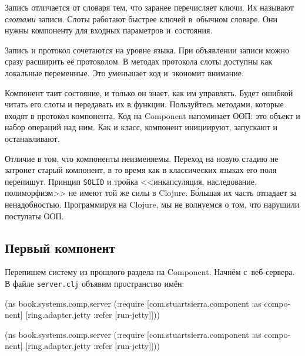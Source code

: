 
Запись отличается от словаря тем, что заранее перечисляет ключи. Их называют
\emph{слотами} записи. Слоты работают быстрее ключей в~обычном словаре. Они
нужны компоненту для входных параметров и~состояния.

Запись и протокол сочетаются на уровне языка. При объявлении записи можно сразу
расширить её протоколом. В методах протокола слоты доступны как локальные
переменные. Это уменьшает код и~экономит внимание.


Компонент таит состояние, и только он знает, как им управлять. Будет ошибкой
читать его слоты и передавать их в функции. Пользуйтесь методами, которые входят
в протокол компонента. Код на Component напоминает ООП: это объект и набор
операций над ним. Как и класс, компонент инициируют, запускают и останавливают.


Отличие в том, что компоненты неизменяемы. Переход на новую стадию не затронет
старый компонент, в то время как в классических языках его поля
перепишут. Принцип \verb|SOLID| и тройка <<инкапсуляция, наследование,
полиморфизм>> не имеют той же силы в Clojure. Б\'{о}льшая их часть отпадает за
ненадобностью. Программируя на Clojure, мы не волнуемся о том, что нарушили
постулаты ООП.

\subsection{Первый компонент}

Перепишем систему из прошлого раздела на Component. Начнём с~веб-сервера. В
файле \verb|server.clj| объявим пространство имён:

\ifx\DEVICETYPE\MOBILE

\begin{english}
  \begin{clojure}
(ns book.systems.comp.server
  (:require
   [com.stuartsierra.component
    :as component]
   [ring.adapter.jetty
    :refer [run-jetty]]))
  \end{clojure}
\end{english}

\else

\begin{english}
  \begin{clojure}
(ns book.systems.comp.server
  (:require
   [com.stuartsierra.component :as component]
   [ring.adapter.jetty :refer [run-jetty]]))
  \end{clojure}
\end{english}

